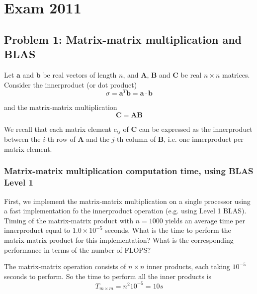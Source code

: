 
\section{Exam 2011} %
\label{sec:exam_2011}

\subsection{Problem 1: Matrix-matrix multiplication and BLAS} %
\label{sub:problem_1}

\begin{question}
  Let $\mathbf{a}$ and $\mathbf{b}$ be real vectors of length $n$, and $\mathbf{A}$, $\mathbf{B}$ and $\mathbf{C}$ be real $n\times n$ matrices. Consider the innerproduct (or dot product)
  \begin{equation}
    \sigma = \mathbf{a}^T \mathbf{b} = \mathbf{a} \cdot \mathbf{b}
  \end{equation}

  and the matrix-matrix multiplication
  \begin{equation}
    \mathbf{C} = \mathbf{AB}
  \end{equation}

  We recall that each matrix element $c_{ij}$ of $\mathbf{C}$ can be expressed as the innerproduct between the $i$-th row of $\mathbf{A}$ and the $j$-th column of $\mathbf{B}$, i.e. one innerproduct per matrix element.
\end{question}

\subsubsection{Matrix-matrix multiplication computation time, using BLAS Level 1} %
\label{ssub:matrix_matrix_multiplication_computation_time}

\begin{question}
  First, we implement the matrix-matrix multiplication on a single processor using a fast implementation fo the innerproduct operation (e.g. using Level 1 BLAS). Timing of the matrix-matrix product with $n=1000$ yields an average time per innerproduct equal to $1.0\times 10^{-5}$ seconds. What is the time to perform the matrix-matrix product for this implementation? What is the corresponding performance in terms of the number of FLOPS?
\end{question}

The matrix-matrix operation consists of $n\times n$ inner products, each taking $10^{-5}$ seconds to perform. So the time to perform all the inner products is
\begin{equation}
  T_{m\times m} = n^2 10^{-5} = 10 s
\end{equation}

